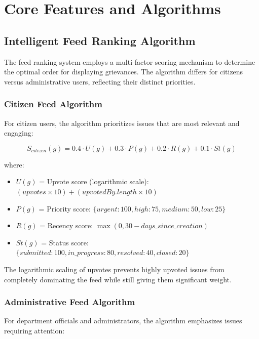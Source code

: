 \documentclass[12pt,a4paper]{article}
\begin{document}
\section{Core Features and Algorithms}

\subsection{Intelligent Feed Ranking Algorithm}

The feed ranking system employs a multi-factor scoring mechanism to determine the optimal order for displaying grievances. The algorithm differs for citizens versus administrative users, reflecting their distinct priorities.

\subsubsection{Citizen Feed Algorithm}

For citizen users, the algorithm prioritizes issues that are most relevant and engaging:

\begin{equation}
S_{citizen}(g) = 0.4 \cdot U(g) + 0.3 \cdot P(g) + 0.2 \cdot R(g) + 0.1 \cdot St(g)
\end{equation}

where:
\begin{itemize}
    \item $U(g)$ = Upvote score (logarithmic scale): $(upvotes \times 10) + (upvotedBy.length \times 10)$
    \item $P(g)$ = Priority score: $\{urgent: 100, high: 75, medium: 50, low: 25\}$
    \item $R(g)$ = Recency score: $\max(0, 30 - days\_since\_creation)$
    \item $St(g)$ = Status score: $\{submitted: 100, in\_progress: 80, resolved: 40, closed: 20\}$
\end{itemize}

The logarithmic scaling of upvotes prevents highly upvoted issues from completely dominating the feed while still giving them significant weight.

\subsubsection{Administrative Feed Algorithm}

For department officials and administrators, the algorithm emphasizes issues requiring attention:
\end{document}

